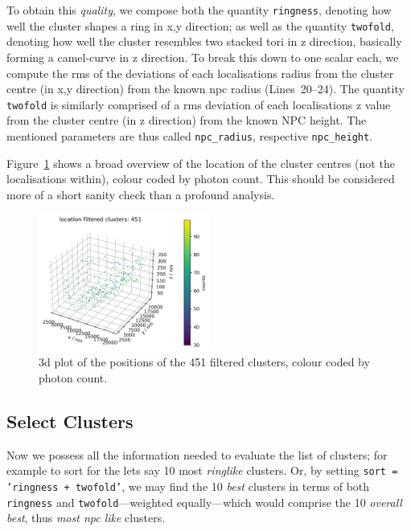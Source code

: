 \documentclass[11pt, a4paper, oneside, twocolumn]{report}
\renewcommand{\tt}{\texttt}
\newcommand{\e}{\emph}
\begin{document}
To obtain this \e{quality}, we compose both the quantity
\tt{ringness}, denoting how well the cluster shapes a ring in x,y
direction; as well as the quantity \tt{twofold}, denoting how well the
cluster resembles two stacked tori in z direction, basically forming a
camel-curve in z direction. To break this down to one scalar each, we
compute the \gls{rms} of the deviations of each localisations radius
from the cluster centre (in x,y direction) from the known \gls{npc}
radius (Lines~20--24). The quantity \tt{twofold} is similarly
comprised of a \gls{rms} deviation of each localisations z value from
the cluster centre (in z direction) from the known NPC height. The
mentioned parameters are thus called \tt{npc\_radius}, respective
\tt{npc\_height}.

Figure~\ref{f:7_filtered_clusters} shows a broad overview of the
location of the cluster centres (not the localisations within), colour
coded by photon count. This should be considered more of a short
sanity check than a profound analysis.

\begin{figure}[h!]
  \centering
  \includegraphics[width=0.5\textwidth]{7_filtered_clusters.png}
  \caption{3d plot of the positions of the 451 filtered clusters,
    colour coded by photon count.}
  \label{f:7_filtered_clusters}
\end{figure}


\subsection{Select Clusters}

Now we possess all the information needed to evaluate the list of
clusters; for example to sort for the lets say 10 most \e{ringlike}
clusters. Or, by setting \tt{sort = 'ringness + twofold'}, we may find
the 10 \e{best} clusters in terms of both \tt{ringness} and
\tt{twofold}---weighted equally---which would comprise the 10
\e{overall best}, thus \e{most \gls{npc} like} clusters.
\end{document}
